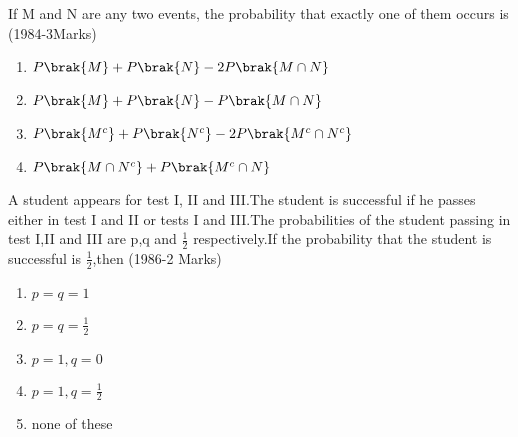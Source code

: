 
\iffalse
  \title{Assignment}
  \author{Pappuri Prahladha}
  \section{mcq-multiple}
\fi

        \item If M and N are any two events, the probability that exactly one of them occurs is \hfill (1984-3Marks)
    \begin{enumerate}
    \item $P\brak{M}+P\brak{N}-2P\brak{M\cap N}$
    \item $P\brak{M}+P\brak{N}-P\brak{M\cap N}$
    \item $P\brak{M^{c}}+P\brak{N^{c}}-2P\brak{M^{c}\cap N^{c}}$
    \item $P\brak{M\cap N^{c}}+P\brak{M^{c}\cap N}$    
    \end{enumerate}
    \item A student appears for test I, II and III.The student is successful if he passes either in test I and II or tests I and III.The probabilities of the student passing in test I,II and III are p,q and $\frac{1}{2}$ respectively.If the probability that the student is successful is $\frac{1}{2}$,then \hfill (1986-2 Marks)
    \begin{multicols}{2}
    \begin{enumerate}
        \item $p=q=1$
        \item $p=q=\frac{1}{2}$
        \item $p=1,q=0$
        \item $p=1,q=\frac{1}{2}$
        \item none of these
    \end{enumerate}
        
    \end{multicols}


